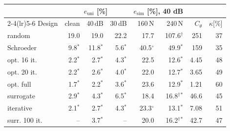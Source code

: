 \begin{tabular}{@{}lrrrrrrr@{}}\toprule
 & \multicolumn{3}{c}{$e_{\mathrm{uni}}$ [\%]} & \multicolumn{2}{c}{$e_{\mathrm{sim}}$ [\%], 40 dB} & & \\
\cmidrule(lr){2-4}\cmidrule(lr){5-6}
Design & clean & 40\,dB & 30\,dB & 160\,N & 240\,N & $C_\theta$ & $\kappa$[\%]\\\midrule
random & 19.0 & 19.0 & 22.2 & 17.7 & 107.6$^\dagger$ & 251 & 37\\
Schroeder & 9.8$^{*}$ & 11.8$^{*}$ & 5.6$^{*}$ & 40.5$^{\circ}$ & 49.9$^{*}$ & 159 & 35\\
opt. 16 it. & 2.2$^{*}$ & 2.7$^{*}$ & 4.3$^{*}$ & 22.5 & 12.6$^{*}$ & 4.45 & 48\\
opt. 20 it. & 2.2$^{*}$ & 2.6$^{*}$ & 4.0$^{*}$ & 22.0 & 12.7$^{*}$ & 3.65 & 49\\
opt. full & 1.7$^{*}$ & 2.2$^{*}$ & 3.6$^{*}$ & 23.6 & 12.9$^{*}$ & 1.21 & 60\\
surrogate & 2.9$^{*}$ & 4.3$^{*}$ & 6.5$^{*}$ & 18.4 & 16.8$^\dagger$$^{*}$ & 46.6 & 45\\
iterative & 2.1$^{*}$ & 2.7$^{*}$ & 4.3$^{*}$ & 23.3$^{\circ}$ & 13.1$^{*}$ & 7.08 & 51\\
surr. 100 it. & -- & 3.7$^{*}$ & -- & 20.0 & 16.2$^\dagger$$^{*}$ & 42.7 & 47\\
\bottomrule\end{tabular}
